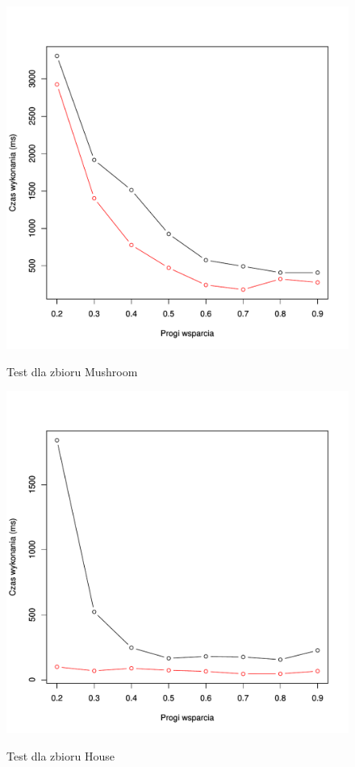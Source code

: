 \begin{figure}
\caption{Test dla zbioru Mushroom}
\includegraphics[scale=0.7]{plots/Mushroom.pdf}
\label{plot:mushroom}
\end{figure}

\begin{figure}
\caption{Test dla zbioru House}
\includegraphics[scale=0.7]{plots/House.pdf}
\label{plot:house}
\end{figure}

